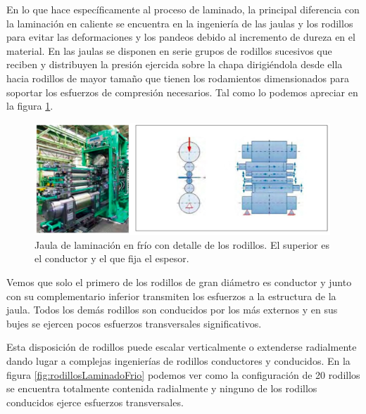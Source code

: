 En lo que hace específicamente al proceso de laminado, la principal diferencia con la laminación en caliente se encuentra en la ingeniería de las jaulas y los rodillos para evitar las deformaciones y los pandeos debido al incremento de dureza en el material. En las jaulas se disponen en serie grupos de rodillos sucesivos que reciben y distribuyen la presión ejercida sobre la chapa dirigiéndola desde ella hacia rodillos de mayor tamaño que tienen los rodamientos dimensionados para soportar los esfuerzos de compresión necesarios. Tal como lo podemos apreciar en la figura \ref{fig:cold_roll_mill_01}. 

\begin{figure}[h]
	\centering
	\includegraphics[width=0.99\textwidth]{./Figures/cold_roll_mill_01.jpg}
	\caption{Jaula de laminación en frío con detalle de los rodillos. El superior es el conductor y el que fija el espesor\protect\footnotemark.}
	\label{fig:cold_roll_mill_01} 
\end{figure}

Vemos que solo el primero de los rodillos de gran diámetro es conductor y junto con su complementario inferior transmiten los esfuerzos a la estructura de la jaula. Todos los demás rodillos son conducidos por los más externos y en sus bujes se ejercen pocos esfuerzos transversales significativos. 

Esta disposición de rodillos puede escalar verticalmente o extenderse radialmente dando lugar a complejas ingenierías de rodillos conductores y conducidos. En la figura \ref{fig:rodillosLaminadoFrio} podemos ver como la configuración de 20 rodillos se encuentra totalmente contenida radialmente y ninguno de los rodillos conducidos ejerce esfuerzos transversales.


